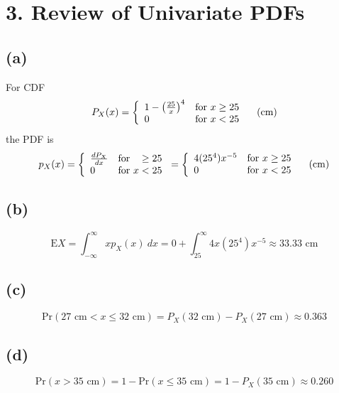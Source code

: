 \documentclass[fleqn, letterpaper]{tufte-handout}
\newcommand{\E}{\text{E}}
\begin{document}
\section{3. Review of Univariate PDFs}
\subsection{(a)}
For CDF
\[
	P_X(x)=\left\{
		\begin{array}{l@{\quad\text{for }}r}
			1-\left(\frac{25}{x}\right)^4 & x\geq25 \\
			0 & x<25
		\end{array}
		\right.
		\quad \text{(cm)}
	\] 
the PDF is
\[
	p_X(x)=\left\{
		\begin{array}{l@{\quad\text{for }}r}
			\frac{dP_X}{dx} & \geq25 \\
			0 & x<25
		\end{array}
		\right.
	=\left\{
		\begin{array}{l@{\quad\text{for }}r}
			4(25^4) x^{-5} & x\geq25 \\
			0 & x<25
		\end{array}
		\right.
		\quad \text{(cm)}
	\]

\subsection{(b)}
\[
	\E X = \int_{-\infty}^\infty xp_X(x)\ dx = 0 + \int_{25}^\infty 4x(25^4) x^{-5} \approx 33.33 \text{ cm}
\]
\subsection{(c)}
\[
	\text{Pr}(27 \text{ cm}< x \leq 32\text{ cm}) = P_X(32\text{ cm}) - P_X(27\text{ cm}) \approx 0.363 
\]
\subsection{(d)}
\[
	\text{Pr}(x > 35\text{ cm}) = 1-\text{Pr}(x \leq 35\text{ cm}) = 1-P_X(35\text{ cm})\approx 0.260 
\]
\end{document}
